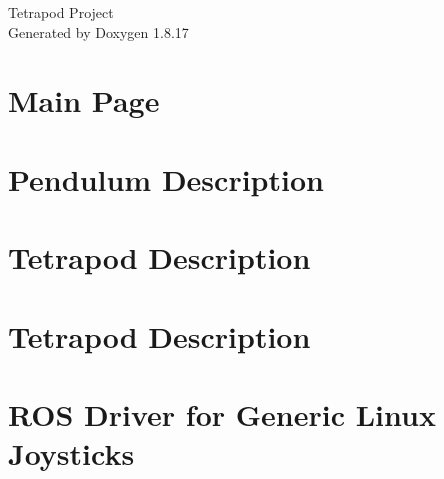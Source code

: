 \let\mypdfximage\pdfximage\def\pdfximage{\immediate\mypdfximage}\documentclass[twoside]{book}
\newcommand{\+}{\discretionary{\mbox{\scriptsize$\hookleftarrow$}}{}{}}
\newcommand{\clearemptydoublepage}{%
  \newpage{\pagestyle{empty}\cleardoublepage}%
}
\begin{document}
\hypersetup{pageanchor=false,
             bookmarksnumbered=true,
             pdfencoding=unicode
            }
\begin{titlepage}
\vspace*{7cm}
\begin{center}%
{\Large Tetrapod Project }\\
\vspace*{1cm}
{\large Generated by Doxygen 1.8.17}\\
\end{center}
\end{titlepage}
\clearemptydoublepage
{}
\tableofcontents
\clearemptydoublepage
{}
\hypersetup{pageanchor=true}

\chapter{Main Page}
\label{index}\hypertarget{index}{}
\chapter{Pendulum Description}
\label{md_catkin_ws_src_simulator_pendulum_description_README}

\chapter{Tetrapod Description}
\label{md_catkin_ws_src_simulator_single_leg_description_README}

\chapter{Tetrapod Description}
\label{md_catkin_ws_src_simulator_tetrapod_description_README}

\chapter{R\+OS Driver for Generic Linux Joysticks}
\label{md_catkin_ws_src_utilities_joystick_drivers_joy_README}

\end{document}
